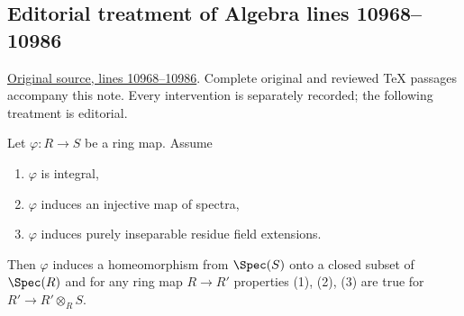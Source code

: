 \subsection{Editorial treatment of Algebra lines 10968--10986}

\hypertarget{algebra-context-133}{}

\noindent\href{https://github.com/stacks/stacks-project/blob/a04446e57ec1fbc252a871afcec7752fb2807b14/algebra.tex\#L10968}{Original source, lines 10968--10986}. Complete original and reviewed TeX passages accompany this note. Every intervention is separately recorded; the following treatment is editorial.


\begin{lemma}
\label{editorial-source-lemma-radicial-integral}
Let $\varphi : R \to S$ be a ring map. Assume
\begin{enumerate}
\item $\varphi$ is integral,
\item $\varphi$ induces an injective map of spectra,
\item $\varphi$ induces purely inseparable residue field extensions.
\end{enumerate}
Then $\varphi$ induces a homeomorphism from $\Spec(S)$ onto a closed
subset of $\Spec(R)$ and for any ring map
$R \to R'$ properties (1), (2), (3) are true for $R' \to R' \otimes_R S$.
\end{lemma}

